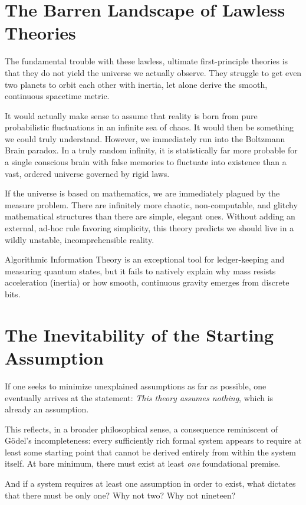 \section{The Barren Landscape of Lawless Theories}

The fundamental trouble with these lawless, ultimate first-principle theories is that they do not yield the universe we actually observe.
They struggle to get even two planets to orbit each other with inertia, let alone derive the smooth, continuous spacetime metric.

It would actually make sense to assume that reality is born from pure probabilistic fluctuations in an infinite sea of chaos.
It would then be something we could truly understand. However, we immediately run into the Boltzmann Brain paradox.
In a truly random infinity, it is statistically far more probable for a single conscious brain with false memories to fluctuate into existence than a vast, ordered universe governed by rigid laws. 

If the universe is based on mathematics, we are immediately plagued by the measure problem.
There are infinitely more chaotic, non-computable, and glitchy mathematical structures than there are simple, elegant ones.
Without adding an external, ad-hoc rule favoring simplicity, this theory predicts we should live in a wildly unstable, incomprehensible reality. 

Algorithmic Information Theory is an exceptional tool for ledger-keeping and measuring quantum states, but it fails to natively explain why mass resists acceleration (inertia) or how smooth, continuous gravity emerges from discrete bits.


\section{The Inevitability of the Starting Assumption}

If one seeks to minimize unexplained assumptions as far as possible, one eventually arrives at the statement:
\textit{This theory assumes nothing}, which is already an assumption.

This reflects, in a broader philosophical sense, a consequence reminiscent of G\"odel's incompleteness:
every sufficiently rich formal system appears to require at least some starting point that cannot be derived entirely from within the system itself.
At bare minimum, there must exist at least \textit{one} foundational premise.

And if a system requires at least one assumption in order to exist, what dictates that there must be only one? Why not two? Why not nineteen?

